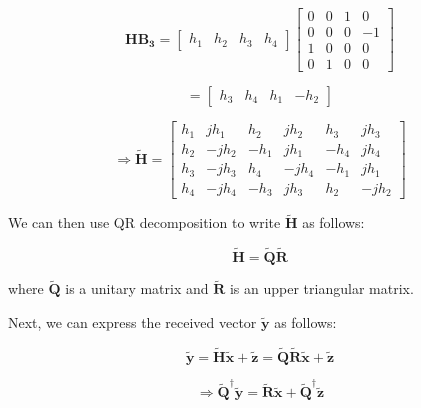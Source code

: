 \documentclass[fleqn]{article}
\begin{document}
\begin{enumerate}
\begin{enumerate}
			\begin{equation*}
				\mathbf{HB_3} = \begin{bmatrix}
					h_1 & h_2 & h_3 & h_4
				\end{bmatrix}\begin{bmatrix}
					0 & 0 & 1 &  0 \\
					0 & 0 & 0 & -1 \\
					1 & 0 & 0 &  0 \\
					0 & 1 & 0 &  0
				\end{bmatrix}
			\end{equation*}
			
			\begin{equation*}
				= \begin{bmatrix}
					h_3 & h_4 & h_1 & -h_2
				\end{bmatrix}
			\end{equation*}
			
			\begin{equation*}
				\Rightarrow \mathbf{\tilde{H}} = \begin{bmatrix}
					h_1 &  jh_1 &  h_2 &  jh_2 &  h_3 &  jh_3 \\
					h_2 & -jh_2 & -h_1 &  jh_1 & -h_4 &  jh_4 \\
					h_3 & -jh_3 &  h_4 & -jh_4 & -h_1 &  jh_1 \\
					h_4 & -jh_4 & -h_3 &  jh_3 &  h_2 & -jh_2
				\end{bmatrix}
			\end{equation*}
			
			We can then use QR decomposition to write $\mathbf{\tilde{H}}$ as follows:
			
			\begin{equation*}
				\mathbf{\tilde{H}} = \mathbf{\tilde{Q}}\mathbf{\tilde{R}}
			\end{equation*}
		\end{enumerate}
		
		where $\mathbf{\tilde{Q}}$ is a unitary matrix and $\mathbf{\tilde{R}}$ is an upper triangular matrix.
		
		Next, we can express the received vector $\mathbf{\tilde{y}}$ as follows:
		
		\begin{equation*}
			\mathbf{\tilde{y}} = \mathbf{\tilde{H}\tilde{x}} + \mathbf{\tilde{z}} = \mathbf{\tilde{Q}\tilde{R}\tilde{x}} + \mathbf{\tilde{z}}
		\end{equation*}
		
		\begin{equation*}
			\Rightarrow \mathbf{\tilde{Q}^{\dagger}\tilde{y}} = \mathbf{\tilde{R}\tilde{x}} + \mathbf{\tilde{Q}^{\dagger}\tilde{z}}
		\end{equation*}
		

\end{enumerate}
\end{document}
